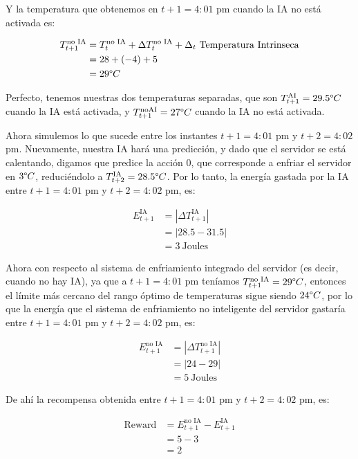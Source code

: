 \documentclass[]{book}
\begin{document}
Y la temperatura que obtenemos en \(t + 1 = 4: 01\) pm cuando la IA no está activada es:

\begin{align*}
    T_{t+1}^{\textrm{no IA}}
    & = T_t^{\textrm{no IA}} + \Delta T_t^{\textrm{no IA}} + \Delta_t \ \textrm{Temperatura Intrinseca} \\
    & = 28 + (-4) + 5 \\
    & = 29 \degree C
\end{align*}

Perfecto, tenemos nuestras dos temperaturas separadas, que son \(T_{t+1}^{\textrm{AI}} = 29.5 \degree C\) cuando la IA está activada, y \(T_{t+1}^{\textrm{noAI}} = 27 \degree C\) cuando la IA no está activada.

Ahora simulemos lo que sucede entre los instantes \(t + 1 = 4:01\) pm y \(t + 2 = 4:02\) pm. Nuevamente, nuestra IA hará una predicción, y dado que el servidor se está calentando, digamos que predice la acción 0, que corresponde a enfriar el servidor en \(3 \degree C\), reduciéndolo a \(T_{t + 2}^{\textrm{IA}} = 28.5 \degree C\). Por lo tanto, la energía gastada por la IA entre \(t + 1 = 4: 01\) pm y \(t + 2 = 4: 02\) pm, es:

\begin{align*}
    E_{t+1}^{\textrm{IA}}
    & = |\Delta T_{t+1}^{\textrm{IA}}| \\
    & = |28.5 - 31.5| \\
    & = 3 \ \textrm{Joules}
\end{align*}

Ahora con respecto al sistema de enfriamiento integrado del servidor (es decir, cuando no hay IA), ya que a \(t + 1 = 4: 01\) pm teníamos \(T_{t + 1}^{\textrm{no IA}} = 29 \degree C\), entonces el límite más cercano del rango óptimo de temperaturas sigue siendo \(24 \degree C\), por lo que la energía que el sistema de enfriamiento no inteligente del servidor gastaría entre \(t + 1 = 4: 01\) pm y \(t + 2 = 4 : 02\) pm, es:

\begin{align*}
    E_{t+1}^{\textrm{no IA}}
    & = |\Delta T_{t+1}^{\textrm{no IA}}| \\
    & = |24 - 29| \\
    & = 5 \ \textrm{Joules}
\end{align*}

De ahí la recompensa obtenida entre \(t+1 = 4:01\) pm y \(t+2 = 4:02\) pm, es:

\begin{align*}
    \textrm{Reward}
    & = E_{t+1}^{\textrm{no IA}} - E_{t+1}^{\textrm{IA}} \\
    & = 5 - 3 \\
    & = 2
\end{align*}
\end{document}
